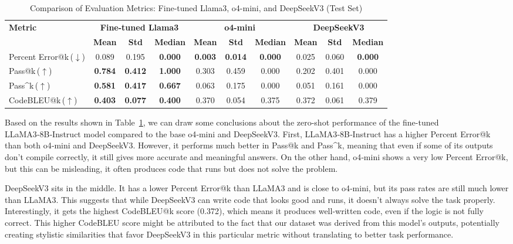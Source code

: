 \begin{table}[hbtp]
\centering
\setlength{\tabcolsep}{3.5pt}
\small
\begin{tabular}{l|ccc|ccc|ccc}
\toprule
\textbf{Metric} & \multicolumn{3}{c|}{\textbf{Fine-tuned Llama3}} & \multicolumn{3}{c|}{\textbf{o4-mini}} & \multicolumn{3}{c}{\textbf{DeepSeekV3}} \\
\cmidrule(lr){2-4} \cmidrule(lr){5-7} \cmidrule(lr){8-10}
 & \textbf{Mean} & \textbf{Std} & \textbf{Median} & \textbf{Mean} & \textbf{Std} & \textbf{Median} & \textbf{Mean} & \textbf{Std} & \textbf{Median} \\
 \midrule
Percent Error@k\,($\downarrow$)  & 0.089 & 0.195 & \textbf{0.000} & \textbf{0.003} & \textbf{0.014} & \textbf{0.000} & 0.025 & 0.060 & \textbf{0.000} \\
Pass@k\,($\uparrow$)           & \textbf{0.784} & \textbf{0.412} & \textbf{1.000} & 0.303 & 0.459 & 0.000 & 0.202 & 0.401 & 0.000 \\
Pass\textasciicircum k\,($\uparrow$)     & \textbf{0.581} & \textbf{0.417} & \textbf{0.667} & 0.063 & 0.175 & 0.000 & 0.051 & 0.161 & 0.000 \\
CodeBLEU@k\,($\uparrow$)     & \textbf{0.403} & \textbf{0.077} & \textbf{0.400} & 0.370 & 0.054 & 0.375 & 0.372 & 0.061 & 0.379 \\
\bottomrule
\end{tabular}
\caption{Comparison of Evaluation Metrics: Fine-tuned Llama3, o4-mini, and DeepSeekV3 (Test Set)}
\label{tab:combined_metrics}
\end{table}

Based on the results shown in Table~\ref{tab:combined_metrics}, we can draw some conclusions about the zero-shot performance of the fine-tuned LLaMA3‑8B‑Instruct model compared to the base o4‑mini and DeepSeekV3. First, LLaMA3‑8B‑Instruct has a higher Percent Error@k than both o4‑mini and DeepSeekV3. However, it performs much better in Pass@k and Pass\textasciicircum k, meaning that even if some of its outputs don't compile correctly, it still gives more accurate and meaningful answers. On the other hand, o4‑mini shows a very low Percent Error@k, but this can be misleading, it often produces code that runs but does not solve the problem.

DeepSeekV3 sits in the middle. It has a lower Percent Error@k than LLaMA3 and is close to o4‑mini, but its pass rates are still much lower than LLaMA3. This suggests that while DeepSeekV3 can write code that looks good and runs, it doesn't always solve the task properly. Interestingly, it gets the highest CodeBLEU@k score (0.372), which means it produces well-written code, even if the logic is not fully correct. This higher CodeBLEU score might be attributed to the fact that our dataset was derived from this model's outputs, potentially creating stylistic similarities that favor DeepSeekV3 in this particular metric without translating to better task performance.


